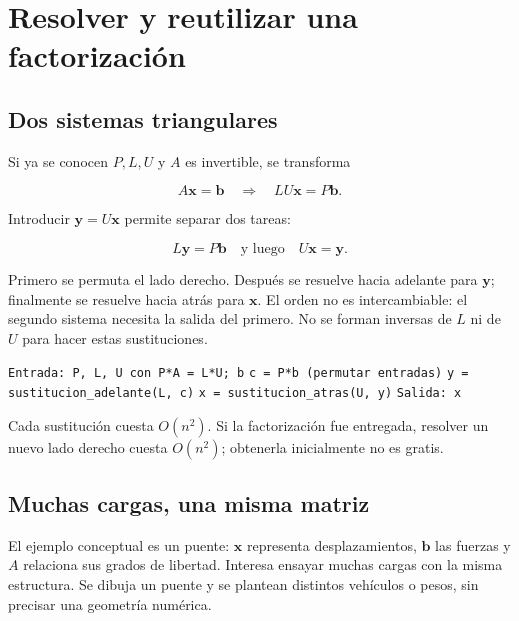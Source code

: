 \documentclass[12pt,a4paper]{article}
\begin{document}
\section{Resolver y reutilizar una factorización}

\subsection{Dos sistemas triangulares}

Si ya se conocen $P,L,U$ y $A$ es invertible, se transforma

\[
A\mathbf x=\mathbf b
\quad\Longrightarrow\quad
LU\mathbf x=P\mathbf b.
\]

Introducir $\mathbf y=U\mathbf x$ permite separar dos tareas:

\[
\boxed{L\mathbf y=P\mathbf b\quad\text{y luego}\quad U\mathbf x=\mathbf y}.
\]

Primero se permuta el lado derecho. Después se resuelve hacia adelante para $\mathbf y$; finalmente se resuelve hacia atrás para $\mathbf x$. El orden no es intercambiable: el segundo sistema necesita la salida del primero. No se forman inversas de $L$ ni de $U$ para hacer estas sustituciones.

\begin{algorithm}[H]
\small\DontPrintSemicolon
\hspace*{0.0em}\texttt{Entrada: P, L, U con P*A = L*U; b}\;
\hspace*{0.0em}\texttt{c = P*b                         (permutar entradas)}\;
\hspace*{0.0em}\texttt{y = sustitucion\_adelante(L, c)}\;
\hspace*{0.0em}\texttt{x = sustitucion\_atras(U, y)}\;
\hspace*{0.0em}\texttt{Salida: x}\;
\end{algorithm}

Cada sustitución cuesta $O(n^2)$. Si la factorización fue entregada, resolver un nuevo lado derecho cuesta $O(n^2)$; obtenerla inicialmente no es gratis.

\subsection{Muchas cargas, una misma matriz}

El ejemplo conceptual es un puente: $\mathbf x$ representa desplazamientos, $\mathbf b$ las fuerzas y $A$ relaciona sus grados de libertad. Interesa ensayar muchas cargas con la misma estructura. Se dibuja un puente y se plantean distintos vehículos o pesos, sin precisar una geometría numérica.
\end{document}
